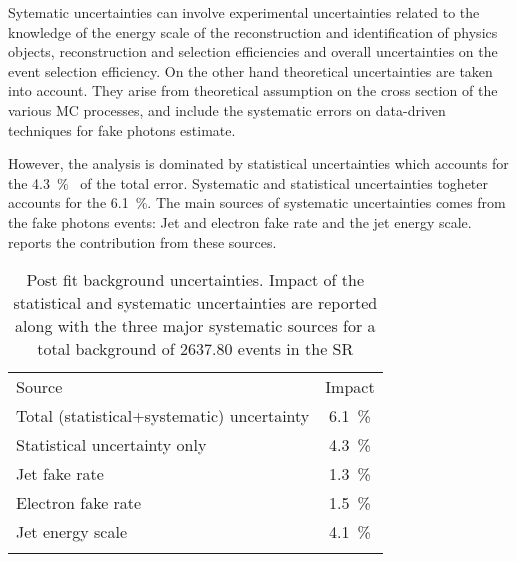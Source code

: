 Sytematic uncertainties can involve experimental uncertainties related to the knowledge of the energy scale of the reconstruction and identification of physics objects, reconstruction and selection efficiencies and overall uncertainties on the event selection efficiency. On the other hand theoretical uncertainties are taken into account. They arise from theoretical assumption on the cross section of the various MC processes, and include the systematic errors on data-driven techniques for fake photons estimate.


However, the \mph analysis is dominated by statistical uncertainties which accounts for the \SI{4.3}{\percent}~\cite{paperMP} of the total error. Systematic and statistical uncertainties togheter accounts for the \SI{6.1}{\percent}. The main sources of systematic uncertainties comes from the fake photons events: Jet and electron fake rate and the jet energy scale. \Tab{\ref{table:sys}} reports the contribution from these sources.

\begin{table}[pt]
\centering
\begin{tabular}{lc}
\noalign{\smallskip}\toprule\noalign{\smallskip}
Source & Impact\\
\noalign{\smallskip}\midrule\noalign{\smallskip}
Total (statistical+systematic) uncertainty & \SI{6.1}{\percent}\\
Statistical uncertainty only & \SI{4.3}{\percent}\\
Jet fake rate & \SI{1.3}{\percent}\\
Electron fake rate& \SI{1.5}{\percent}\\ 
Jet energy scale& \SI{4.1}{\percent}\\
\noalign{\smallskip}\bottomrule\noalign{\smallskip}
\end{tabular}
\caption{Post fit background uncertainties. Impact of the statistical and systematic uncertainties are reported along with the three major systematic sources for a total background of $2637.80$ events in the SR}
\label{table:sys}
\end{table}






